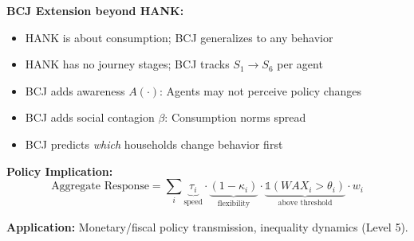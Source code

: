 \begin{tcolorbox}[colback=green!5!white, colframe=green!75!black,
    title=Theorem BCJ-T22: HANK (Heterogeneous Agent New Keynesian) as Special Case]
\textbf{BCJ Extension beyond HANK:}
\begin{itemize}[nosep]
\item HANK is about consumption; BCJ generalizes to any behavior
\item HANK has no journey stages; BCJ tracks $S_1 \to S_6$ per agent
\item BCJ adds awareness $A(\cdot)$: Agents may not perceive policy changes
\item BCJ adds social contagion $\beta$: Consumption norms spread
\item BCJ predicts \textit{which} households change behavior first
\end{itemize}

\textbf{Policy Implication:}
\begin{equation}
\text{Aggregate Response} = \sum_i \underbrace{\tau_i}_{\text{speed}} \cdot \underbrace{(1-\kappa_i)}_{\text{flexibility}} \cdot \underbrace{\mathbb{1}(WAX_i > \theta_i)}_{\text{above threshold}} \cdot w_i
\end{equation}

\textbf{Application:} Monetary/fiscal policy transmission, inequality dynamics (Level 5).
\end{tcolorbox}

